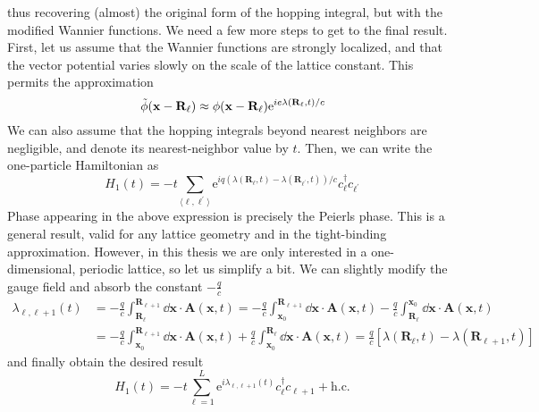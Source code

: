 thus recovering (almost) the original form of the hopping integral, but with the modified Wannier functions.
We need a few more steps to get to the final result. First, let us assume that the Wannier functions
are strongly localized, and that the vector potential varies slowly on the scale of the lattice constant.
This permits the approximation
\begin{equation}
    \Tilde{\phi}(\mathbf{x - \mathbf{R}_{\ell}}) \approx \phi(\mathbf{x - \mathbf{R}_{\ell}}) \mathrm{e}^{i e \lambda(\mathbf{R}_{\ell} ,t) / c}
\end{equation}
We can also assume that the hopping integrals beyond nearest neighbors are negligible, and denote
its nearest-neighbor value by \(t\). Then, we can write the one-particle Hamiltonian as
\begin{equation}
    H_1(t) = -t \sum_{\langle \ell,\ell^{\prime} \rangle } \mathrm{e}^{i q \left( \lambda(\mathbf{R}_{\ell},t) -
    \lambda (\mathbf{R}_{\ell^{\prime}},t) \right) /c } c^{\dag}_{\ell}c_{\ell^{\prime}}
\end{equation}
Phase appearing in the above expression is precisely the Peierls phase. This is a general result, valid for
any lattice geometry and in the tight-binding approximation. However, in this thesis we are only interested in a
one-dimensional, periodic lattice, so let us simplify a bit. We can slightly modify the gauge field
and absorb the constant \(-\frac{q}{c}\)
\begin{align}
    \lambda_{\ell,\ell+1}(t) & = -\frac{q}{c} \int_{\mathbf{R}_{\ell}}^{\mathbf{R}_{\ell+1}} \dd{\mathbf{x}} \cdot \mathbf{A}(\mathbf{x},t)
    = -\frac{q}{c} \int_{\mathbf{x}_0}^{\mathbf{R}_{\ell+1}} \dd{\mathbf{x}} \cdot \mathbf{A}(\mathbf{x},t) - \frac{q}{c} \int_{\mathbf{R}_{\ell}}^{\mathbf{x}_0} \dd{\mathbf{x}} \cdot \mathbf{A}(\mathbf{x},t) \nonumber              \\
                             & = -\frac{q}{c} \int^{\mathbf{R}_{\ell+1}}_{\mathbf{x}_0} \dd{\mathbf{x}}\cdot \mathbf{A}(\mathbf{x},t)+\frac{q}{c} \int_{\mathbf{x}_0}^{\mathbf{R}_{\ell}} \dd{\mathbf{x}}\cdot \mathbf{A}(\mathbf{x},t)
    = \frac{q}{c}\left[ \lambda(\mathbf{R}_{\ell},t) - \lambda(\mathbf{R}_{\ell+1},t) \right]
    \label{eq:peierls_phase}
\end{align}
and finally obtain the desired result
\begin{equation}
    H_1(t) = -t \sum_{ \ell=1}^{L} \mathrm{e}^{i \lambda_{\ell,\ell+1}(t) } c^{\dag}_{\ell}c_{\ell+1} + \mathrm{h.c.}
    \label{eq:peierls_hamiltonian}
\end{equation}
